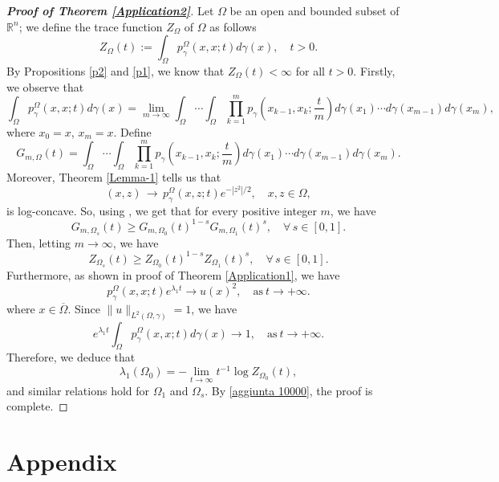 \documentclass[12pt]{amsart}
\newcommand{\R}{\mathbb R}
\newcommand{\1}{\mathbf 1}
\begin{document}
\begin{proof}[\bf Proof of Theorem \ref{Application2}]
Let $\Omega$ be an open and bounded subset of $\R^n$; we define the trace function $Z_\Omega$ of $\Omega$ as follows
\[
Z_\Omega(t):=\int_\Omega p_\gamma^{\Omega}(x,x;t)d\gamma(x), \quad t>0.
\]
By Propositions \ref{p2} and \ref{p1}, we know that $Z_\Omega(t)<\infty$ for all $t>0$. Firstly, we observe that
\[
\int_{\Omega} p^\Omega_{\gamma}(x,x;t)d\gamma(x)=\mathop{\lim}_{m\rightarrow \infty}\int_\Omega\cdots \int_\Omega \mathop{\prod}_{k=1}^{m} p_\gamma \left(x_{k-1},x_k;\frac{t}{m} \right)d\gamma(x_1)\cdots d\gamma(x_{m-1}) d\gamma(x_{m}),
\]
where $x_0=x$, $x_m=x$. Define
\[
G_{m,\Omega}(t)=\int_\Omega\cdots \int_\Omega \mathop{\prod}_{k=1}^{m} p_\gamma \left(x_{k-1},x_k;\frac{t}{m} \right)d\gamma(x_1)\cdots d\gamma(x_{m-1}) d\gamma(x_{m}).
\]
Moreover, Theorem \ref{Lemma-1} tells us that
$$
(x,z)\,\rightarrow\, p_\gamma^\Omega(x,z;t)e^{-|z^2|/2},\quad x,z\in\Omega,
$$
is log-concave. So, using \cite[Corollary 3.4]{BL76}, we get that for every positive integer $m$, we have
\[
G_{m,\Omega_s}(t)\geq G_{m,\Omega_0}(t)^{1-s} G_{m,\Omega_1}(t)^{s},\quad\forall\, s\in [0,1].
\]
Then, letting $m\rightarrow \infty$, we have
\begin{equation}\label{aggiunta 10000}
Z_{\Omega_s}(t)\geq Z_{\Omega_0}(t)^{1-s} Z_{\Omega_1}(t)^{s},\quad\forall\, s\in [0,1].
\end{equation}
Furthermore, as shown in proof of Theorem \ref{Application1}, we have
\[
p_\gamma^{\Omega}(x,x;t)e^{\lambda_1 t}\rightarrow u(x)^2 ,\quad \mathrm{as}\ t\rightarrow +\infty.
\]
where $x\in \overline{\Omega}$. Since $\| u\|_{L^2(\Omega,\gamma)}=1$, we have
\[
 e^{\lambda_1 t}\int_\Omega p_\gamma^{\Omega}(x,x;t) d\gamma(x) \rightarrow 1,\quad \mathrm{as}\ t\rightarrow +\infty.
\]
Therefore, we deduce that
\[
\lambda_1(\Omega_0)=-\mathop{\lim}_{t\rightarrow \infty} t^{-1} \log Z_{\Omega_0}(t),
\]
and similar relations hold for $\Omega_1$ and $\Omega_s$. By \eqref{aggiunta 10000}, the proof is complete.
\end{proof}

\section{Appendix}
\end{document}
